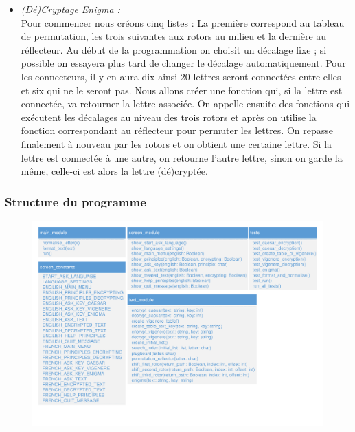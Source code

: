 \documentclass[a4paper,12pt,abstracton,titlepage]{scrartcl}
\begin{document}
\begin{itemize}
\item \textit{(Dé)Cryptage Enigma :}\\
Pour commencer nous créons cinq listes : La première correspond au tableau de permutation, les trois suivantes aux rotors au milieu et la dernière au réflecteur. Au début de la programmation on choisit un décalage fixe ; si possible on essayera plus tard de changer le décalage automatiquement.
Pour les connecteurs, il y en aura dix ainsi 20 lettres seront connectées entre elles et six qui ne le seront pas. Nous allons créer une fonction qui, si la lettre est connectée, va retourner la lettre associée.
On appelle ensuite des fonctions qui exécutent les décalages au niveau des trois rotors et après on utilise la fonction correspondant au réflecteur pour permuter les lettres. On repasse finalement à nouveau par les rotors et on obtient une certaine lettre. Si la lettre est connectée à une autre, on retourne l’autre lettre, sinon on garde la même, celle-ci est alors la lettre (dé)cryptée.\\
\end{itemize}

\newpage

\subsubsection{Structure du programme}
\begin{figure}[tpbh]
	\centering
  \includegraphics[width=\textwidth, trim=0mm 20mm 0mm 0mm, clip]{./Diagrammes/diagrammeDeStructure.pdf}
	\label{img:structure}
\end{figure}
\vspace{0.7cm}
\end{document}
